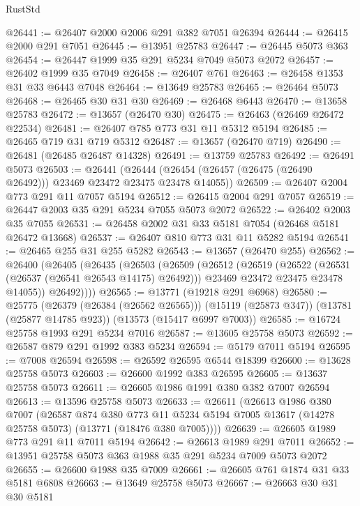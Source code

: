 \begin{lexlean}{RustStd}
\begin{coremodule}
@26441 := @26407 @2000 @2006 @291 @382 @7051 @26394
@26444 := @26415 @2000 @291 @7051
@26445 := @13951 @25783
@26447 := @26445 @5073 @363
@26454 := @26447 @1999 @35 @291 @5234 @7049 @5073 @2072
@26457 := @26402 @1999 @35 @7049
@26458 := @26407 @761
@26463 := @26458 @1353 @31 @33 @6443 @7048
@26464 := @13649 @25783
@26465 := @26464 @5073
@26468 := @26465 @30 @31 @30
@26469 := @26468 @6443
@26470 := @13658 @25783
@26472 := @13657 (@26470 @30)
@26475 := @26463 (@26469 @26472 @22534)
@26481 := @26407 @785 @773 @31 @11 @5312 @5194
@26485 := @26465 @719 @31 @719 @5312
@26487 := @13657 (@26470 @719)
@26490 := @26481 (@26485 @26487 @14328)
@26491 := @13759 @25783
@26492 := @26491 @5073
@26503 := @26441
    (@26444 (@26454 (@26457 (@26475 (@26490 @26492))) @23469 @23472 @23475 @23478 @14055))
@26509 := @26407 @2004 @773 @291 @11 @7057 @5194
@26512 := @26415 @2004 @291 @7057
@26519 := @26447 @2003 @35 @291 @5234 @7055 @5073 @2072
@26522 := @26402 @2003 @35 @7055
@26531 := @26458 @2002 @31 @33 @5181 @7054 (@26468 @5181 @26472 @13668)
@26537 := @26407 @810 @773 @31 @11 @5282 @5194
@26541 := @26465 @255 @31 @255 @5282
@26543 := @13657 (@26470 @255)
@26562 := @26400
    (@26405
      (@26435
        (@26503
          (@26509
            (@26512
              (@26519
                (@26522 (@26531 (@26537 (@26541 @26543 @14175) @26492)))
                @23469
                @23472
                @23475
                @23478
                @14055))
            @26492))))
@26565 := @13771 (@19218 @291 @6968)
@26580 := @25775
    (@26379 (@26384 (@26562 @26565)))
    (@15119 (@25873 @347))
    (@13781 (@25877 @14785 @923))
    (@13573 (@15417 @6997 @7003))
@26585 := @16724 @25758 @1993 @291 @5234 @7016
@26587 := @13605 @25758 @5073
@26592 := @26587 @879 @291 @1992 @383 @5234
@26594 := @5179 @7011 @5194
@26595 := @7008 @26594
@26598 := @26592 @26595 @6544 @18399
@26600 := @13628 @25758 @5073
@26603 := @26600 @1992 @383 @26595
@26605 := @13637 @25758 @5073
@26611 := @26605 @1986 @1991 @380 @382 @7007 @26594
@26613 := @13596 @25758 @5073
@26633 := @26611
    (@26613
      @1986
      @380
      @7007
      (@26587
        @874
        @380
        @773
        @11
        @5234
        @5194
        @7005
        @13617
        (@14278 @25758 @5073)
        (@13771 (@18476 @380 @7005))))
@26639 := @26605 @1989 @773 @291 @11 @7011 @5194
@26642 := @26613 @1989 @291 @7011
@26652 := @13951 @25758 @5073 @363 @1988 @35 @291 @5234 @7009 @5073 @2072
@26655 := @26600 @1988 @35 @7009
@26661 := @26605 @761 @1874 @31 @33 @5181 @6808
@26663 := @13649 @25758 @5073
@26667 := @26663 @30 @31 @30 @5181

\end{coremodule}
\end{lexlean}
